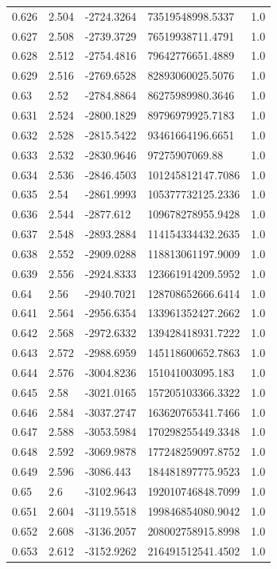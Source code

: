\begin{tabular}{lllll}
0.626 & 2.504 & -2724.3264 & 73519548998.5337 & 1.0 \\
0.627 & 2.508 & -2739.3729 & 76519938711.4791 & 1.0 \\
0.628 & 2.512 & -2754.4816 & 79642776651.4889 & 1.0 \\
0.629 & 2.516 & -2769.6528 & 82893060025.5076 & 1.0 \\
0.63 & 2.52 & -2784.8864 & 86275989980.3646 & 1.0 \\
0.631 & 2.524 & -2800.1829 & 89796979925.7183 & 1.0 \\
0.632 & 2.528 & -2815.5422 & 93461664196.6651 & 1.0 \\
0.633 & 2.532 & -2830.9646 & 97275907069.88 & 1.0 \\
0.634 & 2.536 & -2846.4503 & 101245812147.7086 & 1.0 \\
0.635 & 2.54 & -2861.9993 & 105377732125.2336 & 1.0 \\
0.636 & 2.544 & -2877.612 & 109678278955.9428 & 1.0 \\
0.637 & 2.548 & -2893.2884 & 114154334432.2635 & 1.0 \\
0.638 & 2.552 & -2909.0288 & 118813061197.9009 & 1.0 \\
0.639 & 2.556 & -2924.8333 & 123661914209.5952 & 1.0 \\
0.64 & 2.56 & -2940.7021 & 128708652666.6414 & 1.0 \\
0.641 & 2.564 & -2956.6354 & 133961352427.2662 & 1.0 \\
0.642 & 2.568 & -2972.6332 & 139428418931.7222 & 1.0 \\
0.643 & 2.572 & -2988.6959 & 145118600652.7863 & 1.0 \\
0.644 & 2.576 & -3004.8236 & 151041003095.183 & 1.0 \\
0.645 & 2.58 & -3021.0165 & 157205103366.3322 & 1.0 \\
0.646 & 2.584 & -3037.2747 & 163620765341.7466 & 1.0 \\
0.647 & 2.588 & -3053.5984 & 170298255449.3348 & 1.0 \\
0.648 & 2.592 & -3069.9878 & 177248259097.8752 & 1.0 \\
0.649 & 2.596 & -3086.443 & 184481897775.9523 & 1.0 \\
0.65 & 2.6 & -3102.9643 & 192010746848.7099 & 1.0 \\
0.651 & 2.604 & -3119.5518 & 199846854080.9042 & 1.0 \\
0.652 & 2.608 & -3136.2057 & 208002758915.8998 & 1.0 \\
0.653 & 2.612 & -3152.9262 & 216491512541.4502 & 1.0 \\

\end{tabular}
